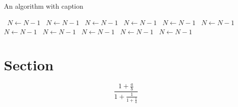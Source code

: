 \documentclass[a4paper]{article}
\begin{document}
\begin{algorithm}
\caption{An algorithm with caption}
\begin{algorithmic}
\    \State $N \gets N - 1$
\    \State $N \gets N - 1$
\    \State $N \gets N - 1$
\    \State $N \gets N - 1$
\    \State $N \gets N - 1$
\    \State $N \gets N - 1$
\    \State $N \gets N - 1$
\    \State $N \gets N - 1$
\    \State $N \gets N - 1$
\    \State $N \gets N - 1$
\    \State $N \gets N - 1$
\EndWhile
\end{algorithmic}
\end{algorithm}

\section{Section}

\[ \frac{1+\frac{a}{b}}{1+\frac{1}{1+\frac{1}{a}}} \]
\end{document}
